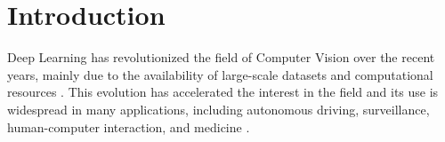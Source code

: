 
\chapter{Introduction}
\label{cha:intro}



Deep Learning has revolutionized the field of Computer Vision over the recent years, mainly due to the availability of large-scale datasets and computational resources \cite{Chai2021, Sun2017}. 
This evolution has accelerated the interest in the field and its use is widespread in many applications, including autonomous driving, surveillance, human-computer interaction, and medicine \cite{Dong2021}.




